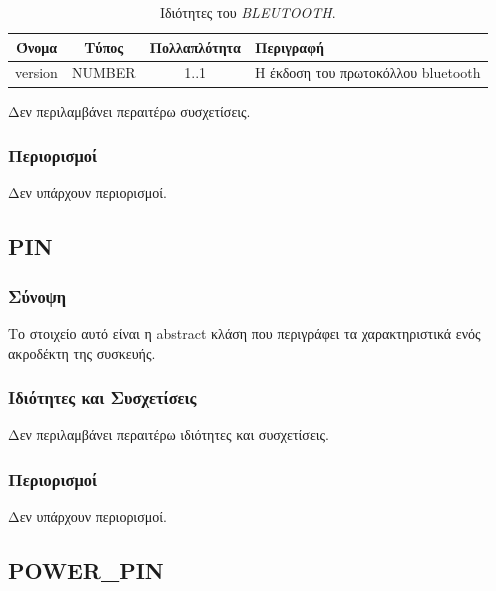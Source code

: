 \begin{table}[H]
	\begin{center}
		\caption{Ιδιότητες του \textit{BLEUTOOTH}.}
		\label{tab:bluetooth}
		\begin{tabular}{ | c | c | c| m{5.5cm} | }
			\hline
			\rowcolor{Gray}
			Όνομα & Τύπος & Πολλαπλότητα & Περιγραφή \\
			\hline
			version & NUMBER & 1..1 & Η έκδοση του πρωτοκόλλου bluetooth \\
			\hline
		\end{tabular}
	\end{center}
\end{table}

\noindent Δεν περιλαμβάνει περαιτέρω συσχετίσεις.

\subsubsection*{Περιορισμοί}

\noindent Δεν υπάρχουν περιορισμοί.

\subsection{PIN}
\label{subsec:pin}

\subsubsection*{Σύνοψη}

\noindent Το στοιχείο αυτό είναι η abstract κλάση που περιγράφει τα χαρακτηριστικά ενός ακροδέκτη της συσκευής.

\subsubsection*{Ιδιότητες και Συσχετίσεις}

\noindent Δεν περιλαμβάνει περαιτέρω ιδιότητες και συσχετίσεις.

\subsubsection*{Περιορισμοί}

\noindent Δεν υπάρχουν περιορισμοί.

\subsection{POWER\_PIN}
\label{subsec:power_pin}

